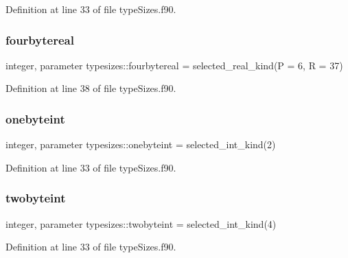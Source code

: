 Definition at line 33 of file type\+Sizes.\+f90.

\mbox{\label{namespacetypesizes_a63d61f1f3d8b3fa297b620f0e3c0b92e}} 
\subsubsection{\texorpdfstring{fourbytereal}{fourbytereal}}
{\footnotesize\ttfamily integer, parameter typesizes\+::fourbytereal = selected\+\_\+real\+\_\+kind(P = 6, R = 37)}



Definition at line 38 of file type\+Sizes.\+f90.

\mbox{\label{namespacetypesizes_aa1f2e4f7a7d6f61a1c684ae370b4b2c4}} 
\subsubsection{\texorpdfstring{onebyteint}{onebyteint}}
{\footnotesize\ttfamily integer, parameter typesizes\+::onebyteint = selected\+\_\+int\+\_\+kind(2)}



Definition at line 33 of file type\+Sizes.\+f90.

\mbox{\label{namespacetypesizes_a69e9798b70a7f85aba877b95cd0dcf50}} 
\subsubsection{\texorpdfstring{twobyteint}{twobyteint}}
{\footnotesize\ttfamily integer, parameter typesizes\+::twobyteint = selected\+\_\+int\+\_\+kind(4)}



Definition at line 33 of file type\+Sizes.\+f90.

